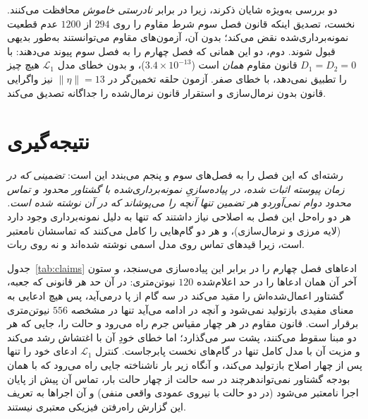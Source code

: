 \documentclass[10pt,twocolumn]{article}
\newcommand{\en}[1]{\lr{#1}}
\newcommand{\md}{\lr{\textemdash}}
\begin{document}
دو بررسی به‌ویژه شایان ذکرند، زیرا در برابر \emph{نادرستی خاموش} محافظت می‌کنند.
نخست، تصدیق اینکه قانون فصل سوم شرط مقاوم را روی $294$ از $1200$ عدم قطعیت نمونه‌برداری‌شده
نقض می‌کند؛ بدون آن، آزمون‌های مقاوم می‌توانستند به‌طور بدیهی قبول شوند. دوم، دو
این همانی که فصل چهارم را به فصل سوم پیوند می‌دهند: با $D_1=D_2=0$ قانون مقاوم
\emph{همان} \en{CLF-QP} است ($3.4\times10^{-13}$)، و بدون خطای مدل $\mathcal{L}_1$
هیچ چیز را تطبیق نمی‌دهد، با خطای صفر. آزمون حلقه تخمین‌گر در $\|\eta\|=13$ نیز
واگرایی قانون بدون نرمال‌سازی و استقرار قانون نرمال‌شده را جداگانه تصدیق می‌کند.

\section{نتیجه‌گیری}
رشته‌ای که این فصل را به فصل‌های سوم و پنجم می‌بندد این است: \emph{تضمینی که در زمان پیوسته
اثبات شده، در پیاده‌سازیِ نمونه‌برداری‌شده با گشتاور محدود و تماس محدود دوام نمی‌آورد\md{}و هر
تضمین تنها آنچه را می‌پوشاند که در آن نوشته شده است.} هر دو راه‌حل این فصل به اصلاحی نیاز
داشتند که تنها به دلیل نمونه‌برداری وجود دارد (لایه مرزی و نرمال‌سازی)، و هر دو گام‌هایی را
کامل می‌کنند که تماسشان نامعتبر است، زیرا قیدهای تماس روی مدل اسمی نوشته شده‌اند و نه روی
ربات.

جدول~\ref{tab:claims} ادعاهای فصل چهارم را در برابر این پیاده‌سازی می‌سنجد، و ستون آخر
آن همان ادعاها را در حد اعلام‌شده $120$ نیوتن‌متری: در آن حد هر قانونی که جعبه، گشتاور
اعمال‌شده‌اش را مقید می‌کند در سه گام از پا درمی‌آید، پس هیچ ادعایی به معنای مفیدی
بازتولید نمی‌شود و آنچه در ادامه می‌آید تنها در مشخصه $556$ نیوتن‌متری برقرار است. قانون
مقاوم در هر چهار مقیاس جرم راه می‌رود و حالت \en{IV} را، جایی که هر دو مبنا سقوط
می‌کنند، پشت سر می‌گذارد؛ اما خطای خودِ آن با اغتشاش رشد می‌کند و مزیت آن با مدل کامل
تنها در گام‌های نخست پابرجاست. کنترل $\mathcal{L}_1$ ادعای خود را تنها پس از چهار اصلاح
بازتولید می‌کند، و آنگاه زیر بار ناشناخته جایی راه می‌رود که \en{CLF-QP} با همان
بودجه گشتاور نمی‌تواند\md{}هرچند در سه حالت از چهار حالت بار، تماس آن پیش از پایان اجرا نامعتبر می‌شود (در دو حالت
با نیروی عمودی واقعی منفی) و آن اجراها به تعریف این گزارش راه‌رفتن فیزیکی معتبری نیستند.
\end{document}
